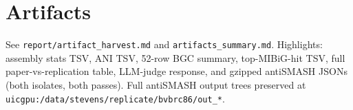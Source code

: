 \documentclass[11pt,letterpaper]{article}
\begin{document}
\section{Artifacts}
See \texttt{report/artifact\_harvest.md} and \texttt{artifacts\_summary.md}. Highlights: assembly stats TSV, ANI TSV, 52-row BGC summary, top-MIBiG-hit TSV, full paper-vs-replication table, LLM-judge response, and gzipped antiSMASH JSONs (both isolates, both passes). Full antiSMASH output trees preserved at \texttt{uicgpu:/data/stevens/replicate/bvbrc86/out\_*}.
\end{document}
